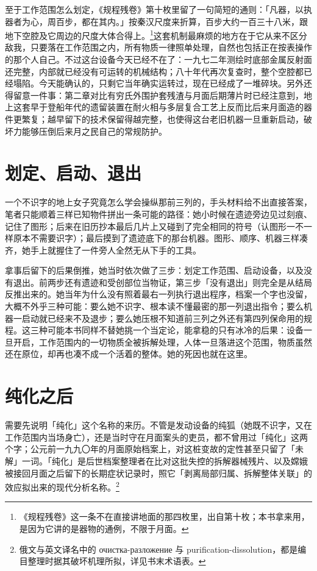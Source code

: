 至于工作范围怎么划定，《规程残卷》第十枚里留了一句简短的通则：「凡器，以执器者为心，周百步，都在其内。」按秦汉尺度来折算，百步大约一百三十八米，跟地下空腔及它周边的尺度大体合得上。\footnote{《规程残卷》这一条不在直接讲地面的那四枚里，出自第十枚；本书拿来用，是因为它讲的是器物的通例，不限于月面。}这套机制最麻烦的地方在于它从来不区分敌我，只要落在工作范围之内，所有物质一律照单处理，自然也包括正在按表操作的那个人自己。不过这台设备今天已经不在了：一九七二年测绘时底部金属反射面还完整，内部就已经没有可运转的机械结构；八十年代再次复查时，整个空腔都已经塌陷。今天能确认的，只剩它当年确实运转过，现在已经成了一堆碎块。另外还得留意一件事：第二章对比有穷氏外围护套残渣与月面后期薄片时已经注意到，地上这套早于登船年代的遗留装置在耐火相与多层复合工艺上反而比后来月面造的器件更繁复；越早留下的技术保留得越完整，也使得这台老旧机器一旦重新启动，破坏力能够压倒后来月之民自己的常规防护。

\section{划定、启动、退出}

一个不识字的地上女子究竟怎么学会操纵那前三列的，手头材料给不出直接答案，笔者只能顺着三样已知物件拼出一条可能的路径：她小时候在遗迹旁边见过刻痕、记住了图形；后来在旧历抄本最后几片上又碰到了完全相同的符号（认图形一不一样原本不需要识字）；最后摸到了遗迹底下的那台机器。图形、顺序、机器三样凑齐，她手上就握住了一件旁人全然无从下手的工具。

拿事后留下的后果倒推，她当时依次做了三步：划定工作范围、启动设备，以及没有退出。前两步还有遗迹和受创部位当物证，第三步「没有退出」则完全是从结局反推出来的。她当年为什么没有照着最右一列执行退出程序，档案一个字也没留，大概不外乎三种可能：要么她不识字、根本读不懂最密的那一列退出指令；要么机器一启动就已经来不及退步；要么她压根不知道前三列之外还有第四列保命用的规程。这三种可能本书同样不替她挑一个当定论，能拿稳的只有冰冷的后果：设备一旦开启，工作范围内的一切物质全被拆解处理，人体一旦落进这个范围，物质虽然还在原位，却再也凑不成一个活着的整体。她的死因也就在这里。

\section{纯化之后}

需要先说明「纯化」这个名称的来历。不管是发动设备的纯狐（她既不识字，又在工作范围内当场身亡），还是当时守在月面案头的吏员，都不曾用过「纯化」这两个字；公元前一九九〇年的月面原始档案上，对这桩变故的定性甚至只留了「未解」一词。「纯化」是后世档案整理者在比对这批失控的拆解器械残片、以及嫦娥被接回月面之后留下的长期症状记录时，照它「剥离局部归属、拆解整体关联」的效应拟出来的现代分析名称。\footnote{俄文与英文译名中的 очистка-разложение 与 purification-dissolution，都是编目整理时据其破坏机理所拟，详见书末术语表。}

